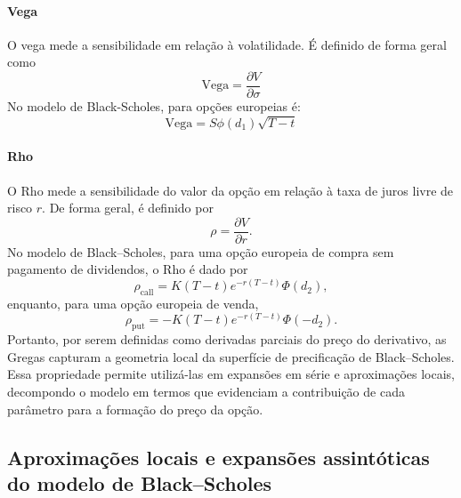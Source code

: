 \paragraph{Vega}

O vega mede a sensibilidade em relação à volatilidade. É definido de forma geral como \begin{equation}
\text{Vega}
=
\frac{\partial V}{\partial \sigma}
\end{equation}
No modelo de Black-Scholes, para opções europeias é:
\begin{equation}
\text{Vega}
=
S\phi(d_1)\sqrt{T-t}
\end{equation}
\paragraph{Rho}

O Rho mede a sensibilidade do valor da opção em relação à taxa de juros livre de risco $r$. De forma geral, é definido por
\begin{equation}
\rho
=
\frac{\partial V}{\partial r}.
\end{equation}
No modelo de Black--Scholes, para uma opção europeia de compra sem pagamento de dividendos, o Rho é dado por
\begin{equation}
\rho_{\text{call}}
=
K(T-t)e^{-r(T-t)}\Phi(d_2),
\end{equation}
enquanto, para uma opção europeia de venda,
\begin{equation}
\rho_{\text{put}}
=
-K(T-t)e^{-r(T-t)}\Phi(-d_2).
\end{equation}
Portanto, por serem definidas como derivadas parciais do preço do derivativo, as Gregas capturam a geometria local da superfície de precificação de Black--Scholes. Essa propriedade permite utilizá-las em expansões em série e aproximações locais, decompondo o modelo em termos que evidenciam a contribuição de cada parâmetro para a formação do preço da opção.

\subsection{Aproximações locais e expansões assintóticas do modelo de Black--Scholes}

